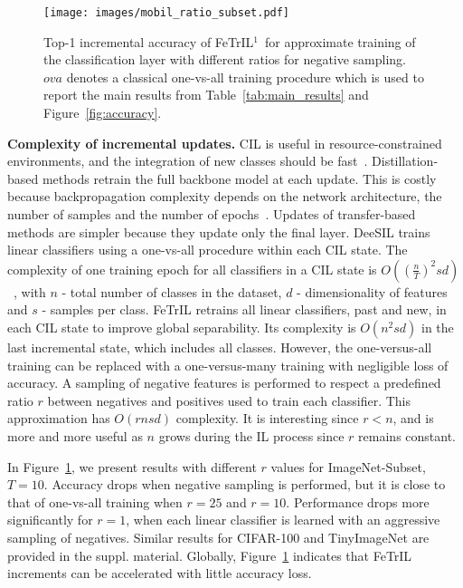 \documentclass[10pt,twocolumn,letterpaper]{article}
\makeatletter
\newcommand{\ourmodel}{FeTrIL\@\xspace}
\newcommand{\ourmodelone}{FeTrIL$^1$~}
\makeatother
\begin{document}
\begin{figure}
\centering
{\texttt{[image: images/mobil\_ratio\_subset.pdf]} }
\vspace{-1mm}
\caption{Top-1 incremental accuracy of \ourmodelone for approximate training of the classification layer with different ratios for negative sampling. $ova$ denotes a classical one-vs-all training procedure which is used to report the main results from Table~\ref{tab:main_results} and Figure~\ref{fig:accuracy}. 
}
\vspace{-5mm}
\label{fig:ratios}
\end{figure}

\textbf{Complexity of incremental updates.}
CIL is useful in resource-constrained environments, and the integration of new classes should be fast~\cite{hayes2022online,ravaglia2021tinyml}.
Distillation-based methods retrain the full backbone model at each update.
This is costly because backpropagation complexity depends on the network architecture, the number of samples and the number of epochs~\cite{goodfellow2016deep}.
Updates of transfer-based methods are simpler because they update only the final layer.
DeeSIL trains linear classifiers using a one-vs-all procedure within each CIL state.
The complexity of one training epoch for all classifiers in a CIL state is $O((\frac{n}{T})^2sd)$~\cite{bottou2007tradeoffs}, with $n$ - total number of classes in the dataset, $d$ - dimensionality of features and $s$ - samples per class.
\ourmodel retrains all linear classifiers, past and new, in each CIL state to improve global separability. 
Its complexity is $O(n^2sd)$ in the last incremental state, which includes all classes.
However, the one-versus-all training can be replaced with a one-versus-many training with negligible loss of accuracy.
A sampling of negative features is performed to respect a predefined ratio $r$ between negatives and positives used to train each classifier.
This approximation has $O(rnsd)$ complexity. 
It is interesting since $r<n$, and is more and more useful as $n$ grows during the IL process since $r$ remains constant.

In Figure~\ref{fig:ratios}, we present results with different $r$ values for ImageNet-Subset, $T=10$. 
Accuracy drops when negative sampling is performed, but it is close to that of one-vs-all training when $r=25$ and $r=10$.
Performance drops more significantly for $r=1$, when each linear classifier is learned with an aggressive sampling of negatives.
Similar results for CIFAR-100 and TinyImageNet are provided in the suppl. material.
Globally, Figure~\ref{fig:ratios} indicates that \ourmodel increments can be accelerated with little accuracy loss. 
\end{document}
